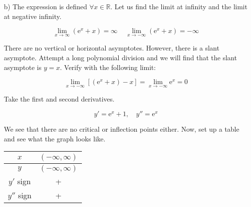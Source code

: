 \documentclass{article}
\begin{document}
\hfill

\noindent b) The expression is defined $\forall x\in \mathbb{R}$. Let us find the limit at infinity and the limit at negative infinity.

\[\lim_{x\to \infty}(\mathrm{e}^x+x)=\infty\,\quad\lim_{x\to -\infty}(\mathrm{e}^x+x)=-\infty\]

\hfill

\noindent There are no vertical or horizontal asymptotes. However, there is a slant asymptote. Attempt a long polynomial division and we will find that the slant asymptote is $y=x$. Verify with the following limit:

\[\lim_{x\to-\infty}\left[(\mathrm{e}^x+x)-x\right]=\lim_{x\to-\infty}\mathrm{e}^x=0\]

\hfill 

\noindent Take the first and second derivatives.

\[y' = \mathrm{e}^x + 1,\quad y'' = \mathrm{e}^x\]

\hfill 

\noindent We see that there are no critical or inflection points either. Now, set up a table and see what the graph looks like.

\begin{center}
    \large
    \begin{tabular}{ |c| c| } 
    \hline
        $x$ & $(-\infty, \infty)$\\
        \hline
        $y$ & $(-\infty, \infty)$\\
        \hline
        $y'$ sign & + \\
        \hline
        $y''$ sign & + \\
        \hline
    \end{tabular}
\end{center}

\hfill

\begin{center}
\end{center}
\end{document}
